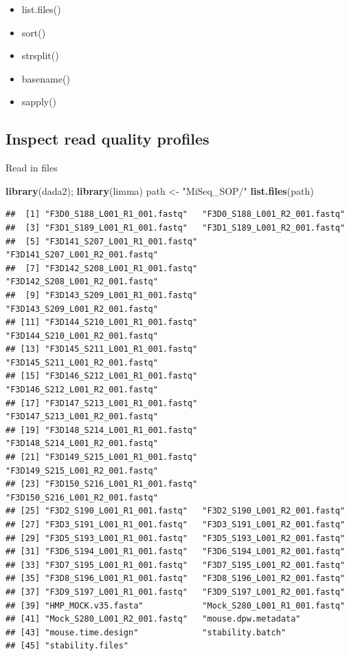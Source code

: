 \documentclass[
]{book}
\newenvironment{Shaded}{\begin{snugshade}}{\end{snugshade}}
\newcommand{\KeywordTok}[1]{\textcolor[rgb]{0.13,0.29,0.53}{\textbf{#1}}}
\newcommand{\NormalTok}[1]{#1}
\newcommand{\StringTok}[1]{\textcolor[rgb]{0.31,0.60,0.02}{#1}}
\providecommand{\tightlist}{%
  \setlength{\itemsep}{0pt}\setlength{\parskip}{0pt}}
\begin{document}
\begin{itemize}
\tightlist
\item
  list.files()
\item
  sort()
\item
  strsplit()
\item
  basename()
\item
  sapply()
\end{itemize}

\hypertarget{inspect-read-quality-profiles}{%
\subsection{Inspect read quality profiles}\label{inspect-read-quality-profiles}}

Read in files

\begin{Shaded}
\begin{Highlighting}[]
\KeywordTok{library}\NormalTok{(dada2);}
\KeywordTok{library}\NormalTok{(limma)}
\NormalTok{path <-}\StringTok{ "MiSeq_SOP/"}
\KeywordTok{list.files}\NormalTok{(path)}
\end{Highlighting}
\end{Shaded}

\begin{verbatim}
##  [1] "F3D0_S188_L001_R1_001.fastq"   "F3D0_S188_L001_R2_001.fastq"  
##  [3] "F3D1_S189_L001_R1_001.fastq"   "F3D1_S189_L001_R2_001.fastq"  
##  [5] "F3D141_S207_L001_R1_001.fastq" "F3D141_S207_L001_R2_001.fastq"
##  [7] "F3D142_S208_L001_R1_001.fastq" "F3D142_S208_L001_R2_001.fastq"
##  [9] "F3D143_S209_L001_R1_001.fastq" "F3D143_S209_L001_R2_001.fastq"
## [11] "F3D144_S210_L001_R1_001.fastq" "F3D144_S210_L001_R2_001.fastq"
## [13] "F3D145_S211_L001_R1_001.fastq" "F3D145_S211_L001_R2_001.fastq"
## [15] "F3D146_S212_L001_R1_001.fastq" "F3D146_S212_L001_R2_001.fastq"
## [17] "F3D147_S213_L001_R1_001.fastq" "F3D147_S213_L001_R2_001.fastq"
## [19] "F3D148_S214_L001_R1_001.fastq" "F3D148_S214_L001_R2_001.fastq"
## [21] "F3D149_S215_L001_R1_001.fastq" "F3D149_S215_L001_R2_001.fastq"
## [23] "F3D150_S216_L001_R1_001.fastq" "F3D150_S216_L001_R2_001.fastq"
## [25] "F3D2_S190_L001_R1_001.fastq"   "F3D2_S190_L001_R2_001.fastq"  
## [27] "F3D3_S191_L001_R1_001.fastq"   "F3D3_S191_L001_R2_001.fastq"  
## [29] "F3D5_S193_L001_R1_001.fastq"   "F3D5_S193_L001_R2_001.fastq"  
## [31] "F3D6_S194_L001_R1_001.fastq"   "F3D6_S194_L001_R2_001.fastq"  
## [33] "F3D7_S195_L001_R1_001.fastq"   "F3D7_S195_L001_R2_001.fastq"  
## [35] "F3D8_S196_L001_R1_001.fastq"   "F3D8_S196_L001_R2_001.fastq"  
## [37] "F3D9_S197_L001_R1_001.fastq"   "F3D9_S197_L001_R2_001.fastq"  
## [39] "HMP_MOCK.v35.fasta"            "Mock_S280_L001_R1_001.fastq"  
## [41] "Mock_S280_L001_R2_001.fastq"   "mouse.dpw.metadata"           
## [43] "mouse.time.design"             "stability.batch"              
## [45] "stability.files"
\end{verbatim}
\end{document}
